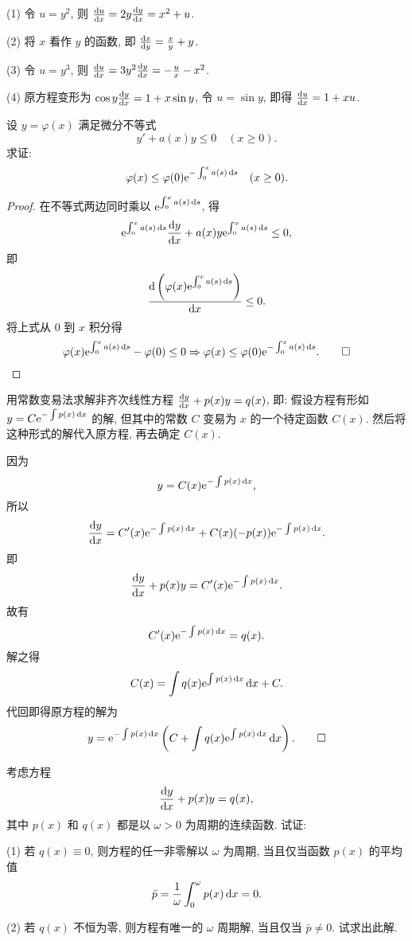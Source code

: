 \begin{solve}
  (1) 令 $u=y^2$, 则 $\frac{\mathop{}\!\mathrm{d} u}{\mathop{}\!\mathrm{d} x}=2y\frac{\mathop{}\!\mathrm{d} y}{\mathop{}\!\mathrm{d} x}=x^2+u$.

  (2) 将 $x$ 看作 $y$ 的函数, 即 $\frac{\mathop{}\!\mathrm{d} x}{\mathop{}\!\mathrm{d} y}=\frac{x}{y}+y$.

  (3) 令 $u=y^3$, 则 $\frac{\mathop{}\!\mathrm{d} u}{\mathop{}\!\mathrm{d} x}=3y^2\frac{\mathop{}\!\mathrm{d} y}{\mathop{}\!\mathrm{d} x}=-\frac{u}{x}-x^2$.

  (4) 原方程变形为 $\cos y\frac{\mathop{}\!\mathrm{d} y}{\mathop{}\!\mathrm{d} x}=1+x\sin y$,
  令 $u=\sin y$, 即得 $\frac{\mathop{}\!\mathrm{d} u}{\mathop{}\!\mathrm{d} x}=1+xu$.
\end{solve}



\begin{exercise}
  设 $y=\varphi(x)$ 满足微分不等式
  \[y'+a(x)y\leq 0\quad (x\geq 0).\]
  求证:
  \[\varphi(x)\leq\varphi(0)\mathrm{e}^{-\int_0^x a(s)\mathop{}\!\mathrm{d} s}\quad (x\geq 0).\]
\end{exercise}

\begin{proof} 
在不等式两边同时乘以 $\mathrm{e}^{\int_0^xa(s)\mathop{}\!\mathrm{d} s}$, 得
\[\mathrm{e}^{\int_0^xa(s)\mathop{}\!\mathrm{d} s}\frac{\mathop{}\!\mathrm{d} y}{\mathop{}\!\mathrm{d} x}+a(x)y\mathrm{e}^{\int_0^xa(s)\mathop{}\!\mathrm{d} s}\leq 0,\]
即
\[\frac{\mathop{}\!\mathrm{d}\left(\varphi(x)\mathrm{e}^{\int_0^xa(s)\mathop{}\!\mathrm{d} s}\right)}{\mathop{}\!\mathrm{d} x}\leq 0.\]
将上式从 $0$ 到 $x$ 积分得
\[\varphi(x)\mathrm{e}^{\int_0^xa(s)\mathop{}\!\mathrm{d} s}-\varphi(0)\leq 0
\Rightarrow\varphi(x)\leq\varphi(0)\mathrm{e}^{-\int_0^xa(s)\mathop{}\!\mathrm{d} s}.\qedhere\]
\end{proof}



\begin{exercise}
  用常数变易法求解非齐次线性方程 $\frac{\mathop{}\!\mathrm{d} y}{\mathop{}\!\mathrm{d} x}+p(x)y=q(x)$, 即: 
  假设方程有形如 $y=C\mathrm{e}^{-\int p(x)\mathop{}\!\mathrm{d} x}$ 的解, 但其中的常数 $C$ 变易为 $x$ 的一个待定函数 $C(x)$. 
  然后将这种形式的解代入原方程, 再去确定 $C(x)$.
\end{exercise}

\begin{solve}
因为
\[y=C(x)\mathrm{e}^{-\int p(x)\mathop{}\!\mathrm{d} x},\]
所以
\[\frac{\mathop{}\!\mathrm{d} y}{\mathop{}\!\mathrm{d} x}=C'(x)\mathrm{e}^{-\int p(x)\mathop{}\!\mathrm{d} x}+C(x)(-p(x))\mathrm{e}^{-\int p(x)\mathop{}\!\mathrm{d} x}.\]
即
\[\frac{\mathop{}\!\mathrm{d} y}{\mathop{}\!\mathrm{d} x}+p(x)y=C'(x)\mathrm{e}^{-\int p(x)\mathop{}\!\mathrm{d} x}.\]
故有
\[C'(x)\mathrm{e}^{-\int p(x)\mathop{}\!\mathrm{d} x} = q(x).\]
解之得
\[C(x)=\int q(x)\mathrm{e}^{\int p(x)\mathop{}\!\mathrm{d} x}\mathop{}\!\mathrm{d} x+C.\]
代回即得原方程的解为
\[y=\mathrm{e}^{-\int p(x)\mathop{}\!\mathrm{d} x}\left(C+\int q(x)\mathrm{e}^{\int p(x)\mathop{}\!\mathrm{d} x}\mathop{}\!\mathrm{d} x\right).\qedhere\]
\end{solve}



\begin{exercise}
  考虑方程
  \[\frac{\mathop{}\!\mathrm{d} y}{\mathop{}\!\mathrm{d} x}+p(x)y=q(x),\]
  其中 $p(x)$ 和 $q(x)$ 都是以 $\omega>0$ 为周期的连续函数. 试证:

  (1) 若 $q(x)\equiv 0$, 则方程的任一非零解以 $\omega$ 为周期, 当且仅当函数 $p(x)$ 的平均值
  \[\bar{p}=\frac{1}{\omega}\int_0^{\omega}p(x)\mathop{}\!\mathrm{d} x=0.\]

  (2) 若 $q(x)$ 不恒为零, 则方程有唯一的 $\omega$ 周期解, 当且仅当 $\bar{p}\neq0$. 试求出此解.
\end{exercise}


